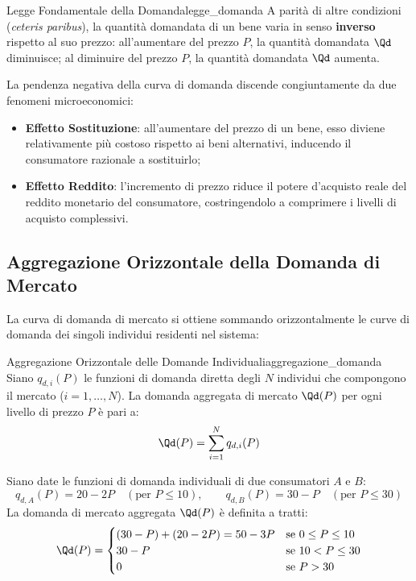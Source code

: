 \begin{legge}{Legge Fondamentale della Domanda}{legge_domanda}
A parità di altre condizioni (\textit{ceteris paribus}), la quantità domandata di un bene varia in senso \textbf{inverso} rispetto al suo prezzo: all'aumentare del prezzo $P$, la quantità domandata $\Qd$ diminuisce; al diminuire del prezzo $P$, la quantità domandata $\Qd$ aumenta.
\end{legge}

La pendenza negativa della curva di domanda discende congiuntamente da due fenomeni microeconomici:
\begin{itemize}
    \item \textbf{Effetto Sostituzione}: all'aumentare del prezzo di un bene, esso diviene relativamente più costoso rispetto ai beni alternativi, inducendo il consumatore razionale a sostituirlo;
    \item \textbf{Effetto Reddito}: l'incremento di prezzo riduce il potere d'acquisto reale del reddito monetario del consumatore, costringendolo a comprimere i livelli di acquisto complessivi.
\end{itemize}

\subsection{Aggregazione Orizzontale della Domanda di Mercato}
La curva di domanda di mercato si ottiene sommando orizzontalmente le curve di domanda dei singoli individui residenti nel sistema:

\begin{teorema}{Aggregazione Orizzontale delle Domande Individuali}{aggregazione_domanda}
Siano $q_{d,i}(P)$ le funzioni di domanda diretta degli $N$ individui che compongono il mercato ($i = 1, \dots, N$). La domanda aggregata di mercato $\Qd(P)$ per ogni livello di prezzo $P$ è pari a:
\begin{equation}
    \Qd(P) = \sum_{i=1}^N q_{d,i}(P)
\end{equation}
\end{teorema}

\begin{esempio}
Siano date le funzioni di domanda individuali di due consumatori $A$ e $B$:
\begin{equation}
    q_{d,A}(P) = 20 - 2P \quad (\text{per } P \le 10), \qquad q_{d,B}(P) = 30 - P \quad (\text{per } P \le 30)
\end{equation}
La domanda di mercato aggregata $\Qd(P)$ è definita a tratti:
\begin{equation}
    \Qd(P) = \begin{cases}
        (30 - P) + (20 - 2P) = 50 - 3P & \text{se } 0 \le P \le 10 \\
        30 - P & \text{se } 10 < P \le 30 \\
        0 & \text{se } P > 30
    \end{cases}
\end{equation}
\end{esempio}

